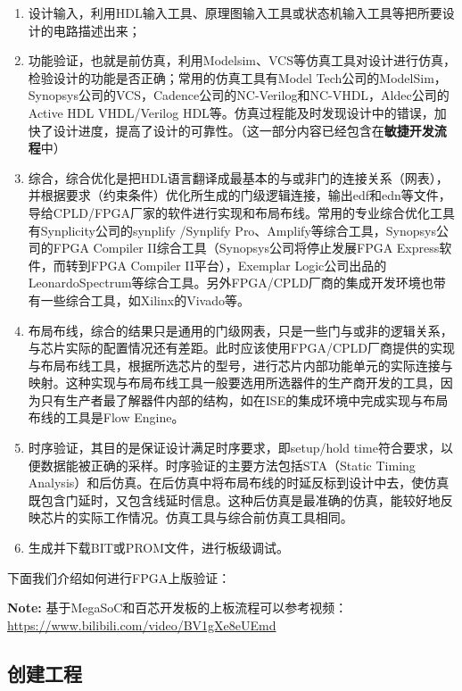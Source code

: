 \begin{enumerate}
\def\labelenumi{\arabic{enumi}.}
\tightlist
\item
  设计输入，利用HDL输入工具、原理图输入工具或状态机输入工具等把所要设计的电路描述出来；
\item
  功能验证，也就是前仿真，利用Modelsim、VCS等仿真工具对设计进行仿真，检验设计的功能是否正确；常用的仿真工具有Model Tech公司的ModelSim，Synopsys公司的VCS，Cadence公司的NC-Verilog和NC-VHDL，Aldec公司的Active HDL VHDL/Verilog HDL等。仿真过程能及时发现设计中的错误，加快了设计进度，提高了设计的可靠性。（这一部分内容已经包含在\textbf{敏捷开发流程}中）
\item
  综合，综合优化是把HDL语言翻译成最基本的与或非门的连接关系（网表），并根据要求（约束条件）优化所生成的门级逻辑连接，输出edf和edn等文件，导给CPLD/FPGA厂家的软件进行实现和布局布线。常用的专业综合优化工具有Synplicity公司的synplify /Synplify Pro、Amplify等综合工具，Synopsys公司的FPGA Compiler II综合工具（Synopsys公司将停止发展FPGA Express软件，而转到FPGA Compiler II平台），Exemplar Logic公司出品的LeonardoSpectrum等综合工具。另外FPGA/CPLD厂商的集成开发环境也带有一些综合工具，如Xilinx的Vivado等。
\item
  布局布线，综合的结果只是通用的门级网表，只是一些门与或非的逻辑关系，与芯片实际的配置情况还有差距。此时应该使用FPGA/CPLD厂商提供的实现与布局布线工具，根据所选芯片的型号，进行芯片内部功能单元的实际连接与映射。这种实现与布局布线工具一般要选用所选器件的生产商开发的工具，因为只有生产者最了解器件内部的结构，如在ISE的集成环境中完成实现与布局布线的工具是Flow Engine。
\item
  时序验证，其目的是保证设计满足时序要求，即setup/hold time符合要求，以便数据能被正确的采样。时序验证的主要方法包括STA（Static Timing Analysis）和后仿真。在后仿真中将布局布线的时延反标到设计中去，使仿真既包含门延时，又包含线延时信息。这种后仿真是最准确的仿真，能较好地反映芯片的实际工作情况。仿真工具与综合前仿真工具相同。
\item
  生成并下载BIT或PROM文件，进行板级调试。
\end{enumerate}

下面我们介绍如何进行FPGA上版验证：

\textbf{Note:} 基于MegaSoC和百芯开发板的上板流程可以参考视频：\url{https://www.bilibili.com/video/BV1gXe8eUEmd}

\subsection{创建工程}\label{sec:08-verification-and-implementation-004}

